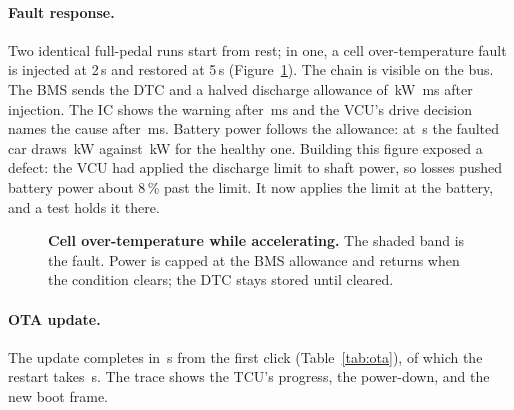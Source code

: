 \documentclass[10pt]{article}
\begin{document}
\paragraph{Fault response.} Two identical full-pedal runs start from rest; in one, a cell over-temperature fault is injected at 2\,s and restored at 5\,s (Figure~\ref{fig:fault}). The chain is visible on the bus. The BMS sends the DTC and a halved discharge allowance of \FaultLimitKw\,kW \FaultDtcMs\,ms after injection. The IC shows the warning after \FaultWarningMs\,ms and the VCU's drive decision names the cause after \FaultDecisionMs\,ms. Battery power follows the allowance: at \FaultCompareS\,s the faulted car draws \FaultDeratedKw\,kW against \FaultHealthyKw\,kW for the healthy one. Building this figure exposed a defect: the VCU had applied the discharge limit to shaft power, so losses pushed battery power about 8\,\% past the limit. It now applies the limit at the battery, and a test holds it there.

\begin{figure}[!htbp]
\centering
{}
\caption{\textbf{Cell over-temperature while accelerating.} The shaded band is the fault. Power is capped at the BMS allowance and returns when the condition clears; the DTC stays stored until cleared.}
\label{fig:fault}
\end{figure}

\paragraph{OTA update.} The update completes in \OtaReadyS\,s from the first click (Table~\ref{tab:ota}), of which the restart takes \OtaRestartS\,s. The trace shows the TCU's progress, the power-down, and the new boot frame.

\end{document}
